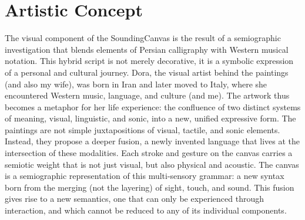 \documentclass{article}
\begin{document}
\section{Artistic Concept}
 The visual component of the SoundingCanvas is the result of a semiographic investigation that blends elements of Persian calligraphy with Western musical notation. This hybrid script is not merely decorative, it is a symbolic expression of a personal and cultural journey. Dora, the visual artist behind the paintings (and also my wife), was born in Iran and later moved to Italy, where she encountered Western music, language, and culture (and me). The artwork thus becomes a metaphor for her life experience: the confluence of two distinct systems of meaning, visual, linguistic, and sonic, into a new, unified expressive form. \newline
 The paintings are not simple juxtapositions of visual, tactile, and sonic elements. Instead, they propose a deeper fusion, a newly invented language that lives at the intersection of these modalities. Each stroke and gesture on the canvas carries a semiotic weight that is not just visual, but also physical and acoustic. The canvas is a semiographic representation of this multi-sensory grammar: a new syntax born from the merging (not the layering) of sight, touch, and sound. This fusion gives rise to a new semantics, one that can only be experienced through interaction, and which cannot be reduced to any of its individual components.
\end{document}
